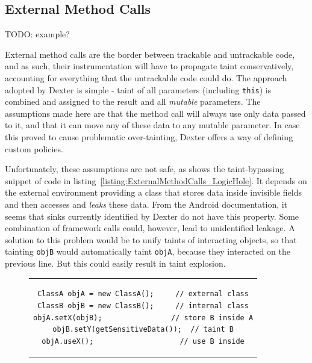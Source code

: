 \documentclass[12pt,twoside,notitlepage]{report}
\begin{document}
\subsection{External Method Calls}

TODO: example?

External method calls are the border between trackable and untrackable code, and as such, their instrumentation will have to propagate taint conservatively, accounting for everything that the untrackable code could do. The approach adopted by Dexter is simple - taint of all parameters (including \verb$this$) is combined and assigned to the result and all \emph{mutable} parameters. The assumptions made here are that the method call will always use only data passed to it, and that it can move any of these data to any mutable parameter. In case this proved to cause problematic over-tainting, Dexter offers a way of defining custom policies.

Unfortunately, these assumptions are not safe, as shows the taint-bypassing snippet of code in listing~\ref{listing:ExternalMethodCalls_LogicHole}. It depends on the external environment providing a class that stores data inside invisible fields and then accesses and \emph{leaks} these data. From the Android documentation, it seems that sinks currently identified by Dexter do not have this property. Some combination of framework calls could, however, lead to unidentified leakage. A solution to this problem would be to unify taints of interacting objects, so that tainting \verb$objB$ would automatically taint \verb$objA$, because they interacted on the previous line. But this could easily result in taint explosion.

\begin{figure}[h]
	\centering
	\begin{tabular}{c}
	\begin{lstlisting}
ClassA objA = new ClassA();     // external class
ClassB objB = new ClassB();     // internal class
objA.setX(objB);                // store B inside A
objB.setY(getSensitiveData());  // taint B
objA.useX();                    // use B inside
	\end{lstlisting}
	\end{tabular}
	\begin{lstlisting}[caption={Example of a propagation logic hole},
	                   label={listing:ExternalMethodCalls_LogicHole}]
	\end{lstlisting}
\end{figure}
\end{document}
